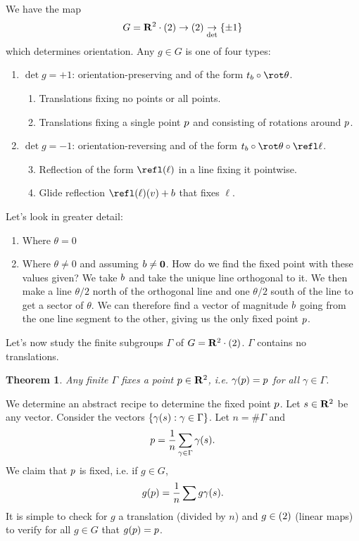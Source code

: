 \documentclass[11pt, oneside]{amsart}
\numberwithin{equation}{section}
\newtheorem{theorem}{Theorem}
\numberwithin{theorem}{section}
\theoremstyle{definition}
\let\O\relax
\let\bf\relax
\def\R{\mathbf{R}}
\def\0{\mathbf{0}}
\begin{document}
We have the map
$$
G =\R^2 \cdot \O(2) \to \O(2)\underset{\det}{\to} \{\pm 1\}
$$ 
which determines orientation. Any $g\in G$ is one of four types:
\begin{enumerate}[label=(\alph*)]
\item $\det g = +1$: orientation-preserving and of the form $t_\bf b \circ\rot\theta$.
\begin{enumerate}[label=(\roman*)]
\item Translations fixing no points or all points.
\item Translations fixing a single point $\bf p$ and consisting of rotations around $\bf p$.
\end{enumerate}
\item $\det g=-1$: orientation-reversing and of the form $t_\bf b \circ\rot\theta\circ\refl\ell$.
\begin{enumerate}[label=(\roman*)]
\setcounter{enumii}{2}
\item Reflection of the form $\refl (\ell)$ in a line fixing it pointwise.
\item Glide reflection $\refl(\ell)(\bf v) + \bf b$ that fixes $\ell$.
\end{enumerate}
\end{enumerate}
Let's look in greater detail:
\begin{enumerate}[label=(\roman*)]
\item Where $\theta = 0$
\item Where $\theta \neq 0$ and assuming $\bf b \neq \0$. How do we find the fixed point with these values given? We take $\bf b$ and take the unique line orthogonal to it. We then make a line $\theta/2$ north of the orthogonal line and one  $\theta/2$ south of the line to get a sector of $\theta$. We can therefore find a vector of magnitude $\bf b$ going from the one line segment to the other, giving us the only fixed point $\bf p$. 
\end{enumerate}

Let's now study the finite subgroups $\Gamma$ of $G=\R^2\cdot \O(2)$. $\Gamma$ contains no translations. 
\begin{theorem}
Any finite $\Gamma$ fixes a point $\bf p \in \R^2$, i.e. $\gamma(\bf p) = \bf p$ for all $\gamma \in \Gamma$.
\end{theorem}
We determine an abstract recipe to determine the fixed point $\bf p$. Let $\bf s\in \R^2$ be any vector. Consider the vectors $\{\gamma(\bf s) : \gamma \in \Gamma\}$. Let $n = \#\Gamma$ and  
$$
\bf p = \frac{1}{n} \sum_{\gamma\in\Gamma} \gamma(\bf s).
$$
We claim that $\bf p$ is fixed, i.e. if $g\in G$, 
$$
g(\bf p) = \frac{1}{n}\sum g\gamma(\bf s).
$$
It is simple to check for $g$ a translation (divided by $n$) and $g\in \O(2)$ (linear maps) to verify for all $g\in G$ that $g(\bf p) = \bf p$.
\end{document}
